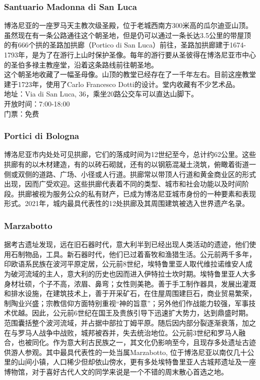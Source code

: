 \subsubsection{Santuario Madonna di San Luca}
博洛尼亚的一座罗马天主教次级圣殿，位于老城西南方300米高的瓜尔迪亚山顶。
虽然现在有一条公路通往这个朝圣地，但是仍可以通过一条长达3.5公里的带屋顶的有666个拱的圣路加拱廊（Portico di San Luca）前往，圣路加拱廊建于1674-1793年，是为了在游行上山时保护圣像。每年的游行要从圣彼得在博洛尼亚市中心的圣伯多禄主教座堂，沿着这条路线前往朝圣地。\\
这个朝圣地收藏了一幅圣母像。山顶的教堂已经存在了一千年左右。目前这座教堂建于1723年，使用了Carlo Francesco Dotti的设计。堂内收藏有不少艺术品。\\
地址：Via di San Luca, 36，乘坐20路公交车可以直达山脚下。\\
开放时间：7:00-18:00\\
门票：免费

\subsubsection{Portici di Bologna}
博洛尼亚市内处处可见拱廊，它们的落成时间为12世纪至今，总计约62公里。这些拱廊有的以木材建造，有的以砖石砌就，还有的以钢筋混凝土浇筑，俯瞰着街道一侧或双侧的道路、广场、小径或人行道。拱廊常以带顶人行道和黄金商业区的形式出现，因而广受欢迎。这些拱廊代表着不同的类型、城市和社会功能以及时间阶段。拱廊被视为服务公众的私有财产，已成为博洛尼亚城市身份的一种要素和表现形式。2021年，城内最具代表性的12处拱廊及其周围建筑被选入世界遗产名录。

\subsubsection{Marzabotto}
据考古遗址发现，远在旧石器时代，意大利半到已经出现人类活动的遗迹，他们使用石制物品，工具。新石器时代，他们已过着畜牧和渔猎生活。公元前两千多年，印欧语系民族在波河平原定居，公元前8世纪，埃特鲁里亚人取代维拉诺维安人成为破河流域的主人，意大利的历史也因而进入伊特拉士坎时期。埃特鲁里亚人大多身材壮硕，个子不高，浓眉、鼻弯；女性则美艳。善于手工制作器具，发展出灌溉和排水设施，在建筑技术上，善于开采矿石，在住屋周围建巨石，商业贸易繁荣，制陶业兴盛；宗教信仰方面特别重视“神的旨意”；另外他们作战能力较强，军事技术优越。因此，公元前6世纪在国王及贵族引导下迅速扩大势力，达到鼎盛时期。范围囊括整个波河流域，并占据中部拉丁姆平原。随后因内部分裂逐渐衰落，加之在与罗马人战争中战败，城邦被吞并，失去统治地位。公元前3世纪和罗马人融合，也被同化。作为意大利古民族之一，其文化仍影响至今，且现存多处遗址古迹供游人参观。其中最具代表性的一处当属Marzabotto, 位于博洛尼亚以南仅几十公里的山间小镇，人口稀少但却依山傍水，更有多处埃特鲁里亚人古城邦遗址及一座博物馆，对于喜好古代人文的同学来说是一个不错的周末散心首选之地。


